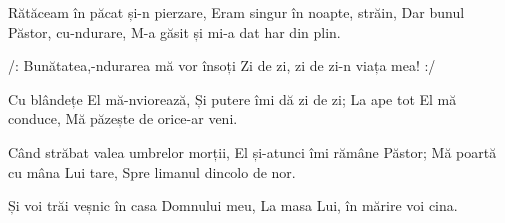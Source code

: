 \beginverse
Rătăceam în păcat și-n pierzare,
Eram singur în noapte, străin,
Dar bunul Păstor, cu-ndurare,
M-a găsit și mi-a dat har din plin.
\endverse

\beginchorus
/: Bunătatea,-ndurarea mă vor însoți
Zi de zi, zi de zi-n viața mea! :/
\endchorus

\beginverse
Cu blândețe El mă-nviorează,
Și putere îmi dă zi de zi;
La ape tot El mă conduce,
Mă păzește de orice-ar veni.
\endverse

\beginverse
Când străbat valea umbrelor morții,
El și-atunci îmi rămâne Păstor;
Mă poartă cu mâna Lui tare,
Spre limanul dincolo de nor.
\endverse

\beginverse*
Și voi trăi veșnic în casa Domnului meu,
La masa Lui, în mărire voi cina.
\endverse
\endsong